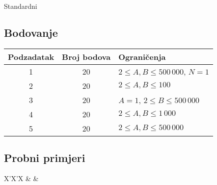 \begin{statement}[
  problempoints=100,
  timelimit=1 sekunda,
  memorylimit=512 MiB,
]{Standardni}
\subsection*{Bodovanje}
{\renewcommand{\arraystretch}{1.4}
  \setlength{\tabcolsep}{6pt}
  \begin{tabular}{ccl}
 Podzadatak & Broj bodova & Ograničenja \\ \midrule
  1 & 20 & $2 \le A, B \le 500\,000$, $N = 1$\\
  2 & 20 & $2 \le A, B \le 100$ \\
  3 & 20 & $A = 1$, $2 \le B \le 500\,000$ \\
  4 & 20 & $2 \le A, B \le 1\,000$ \\
  5 & 20 & $2 \le A, B \le 500\,000$ \\
\end{tabular}}

\subsection*{Probni primjeri}
\begin{tabularx}{\textwidth}{X'X'X}
 &
 &
\end{tabularx}

\end{statement}


